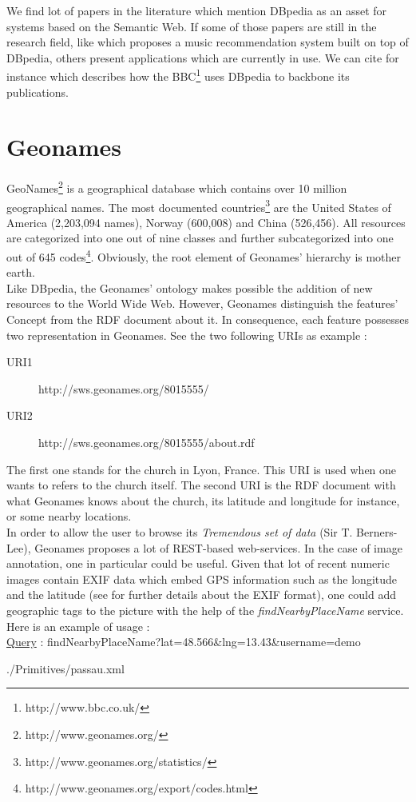 We find lot of papers in the literature which mention DBpedia as an asset for systems based on the Semantic Web. If some of those papers are still in the research field, like \cite{passant2010dbrec} which proposes a music recommendation system built on top of DBpedia, others present  applications which are currently in use. We can cite for instance \cite{kobilarov2009media} which describes how the BBC\footnote{http://www.bbc.co.uk/} uses DBpedia to backbone its publications. 

\section{Geonames} %
\label{sec:geonames}

GeoNames\footnote{http://www.geonames.org/} is a geographical database which contains over 10 million geographical names. The most documented countries\footnote{http://www.geonames.org/statistics/} are the United States of America (2,203,094 names), Norway (600,008) and China (526,456). All resources are categorized into one out of nine classes and further subcategorized into one out of 645 codes\footnote{http://www.geonames.org/export/codes.html}. Obviously, the root element of Geonames' hierarchy is mother earth.\\

Like DBpedia, the Geonames' ontology makes possible the addition of new resources to the World Wide Web. However, Geonames distinguish the features' Concept from the RDF document about it. In consequence, each feature possesses two representation in Geonames. See the two following URIs as example :
\begin{description}
\item[URI1] http://sws.geonames.org/8015555/
\item[URI2] http://sws.geonames.org/8015555/about.rdf
\end{description}
The first one stands for the  church in Lyon, France. This URI is used when one wants to refers to the church itself. The second URI is the RDF document with what Geonames knows about the church, its latitude and longitude for instance, or some nearby locations.\\

In order to allow the user to browse its \emph{Tremendous set of data} (Sir T. Berners-Lee), Geonames proposes a lot of REST-based web-services. In the case of image annotation, one in particular could be useful. Given that lot of recent numeric images contain EXIF data which embed GPS information such as the longitude and the latitude (see \cite{tevsic2005metadata} for further details about the EXIF format), one could add geographic tags to the picture with the help of the \textit{findNearbyPlaceName} service. Here is an example of usage :\\
\underline{Query} : findNearbyPlaceName?lat=48.566\&lng=13.43\&username=demo 

	{./Primitives/passau.xml}

